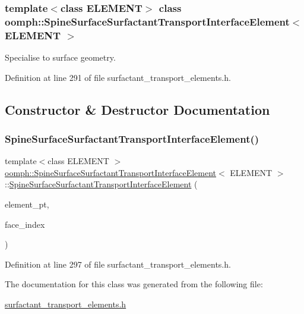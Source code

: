 \subsubsection*{template$<$class E\+L\+E\+M\+E\+NT$>$\newline
class oomph\+::\+Spine\+Surface\+Surfactant\+Transport\+Interface\+Element$<$ E\+L\+E\+M\+E\+N\+T $>$}

Specialise to surface geometry. 

Definition at line 291 of file surfactant\+\_\+transport\+\_\+elements.\+h.



\subsection{Constructor \& Destructor Documentation}
\mbox{\label{classoomph_1_1SpineSurfaceSurfactantTransportInterfaceElement_aa3014e796ec7e0bfa26824fc42184d06}} 
\subsubsection{\texorpdfstring{Spine\+Surface\+Surfactant\+Transport\+Interface\+Element()}{SpineSurfaceSurfactantTransportInterfaceElement()}}
{\footnotesize\ttfamily template$<$class E\+L\+E\+M\+E\+NT $>$ \\
\hyperlink{classoomph_1_1SpineSurfaceSurfactantTransportInterfaceElement}{oomph\+::\+Spine\+Surface\+Surfactant\+Transport\+Interface\+Element}$<$ E\+L\+E\+M\+E\+NT $>$\+::\hyperlink{classoomph_1_1SpineSurfaceSurfactantTransportInterfaceElement}{Spine\+Surface\+Surfactant\+Transport\+Interface\+Element} (\begin{DoxyParamCaption}\item[{Finite\+Element $\ast$const \&}]{element\+\_\+pt,  }\item[{const int \&}]{face\+\_\+index }\end{DoxyParamCaption})\hspace{0.3cm}{\ttfamily [inline]}}



Definition at line 297 of file surfactant\+\_\+transport\+\_\+elements.\+h.



The documentation for this class was generated from the following file\+:\begin{DoxyCompactItemize}
\item 
\hyperlink{surfactant__transport__elements_8h}{surfactant\+\_\+transport\+\_\+elements.\+h}\end{DoxyCompactItemize}
